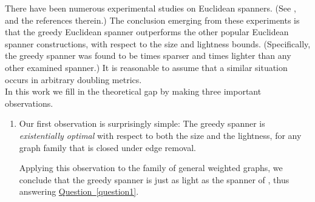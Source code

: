 \documentclass[11pt,letterpaper]{article}
\newcommand{\namedref}[2]{\hyperref[#2]{#1~\ref*{#2}}}
\newcommand{\questionref}[1]{\namedref{Question}{#1}}
\begin{document}
There have been numerous experimental studies on Euclidean spanners. (See \cite{FG05,Far08}, and the references therein.)
The conclusion emerging from these experiments is that the greedy Euclidean spanner outperforms the other popular Euclidean spanner constructions, with respect to the
size and lightness bounds. (Specifically, the greedy spanner was found to be  times sparser and  times lighter than any other examined spanner.)
It is reasonable to assume that a similar situation occurs in arbitrary doubling metrics.
\vspace{6pt}
\\
In this work we fill in the theoretical gap by making three important observations.
\begin{enumerate}
	\item Our first observation is surprisingly simple: The greedy spanner is \emph{existentially optimal} with respect to both the size and the lightness,
	for any graph family  that is closed under edge removal.
	
	\vspace{5pt}	
	Applying this observation to the family of general weighted graphs, we conclude that the greedy spanner is just as light as the spanner of \cite{CW18}, thus answering \questionref{question1}.


\end{enumerate}
\end{document}
